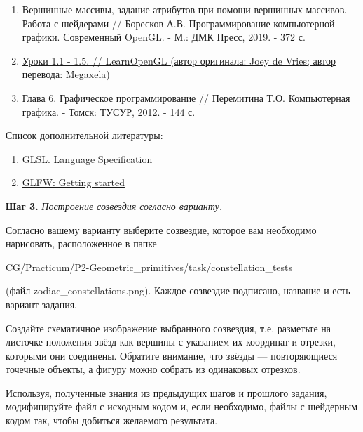 \documentclass[a4paper,12pt]{article}
\begin{document}
    \begin{enumerate}
        \item 
        Вершинные массивы, задание атрибутов при помощи вершинных массивов. Работа с шейдерами // Боресков А.В. Программирование компьютерной графики. Современный OpenGL. - М.: ДМК Пресс, 2019. - 372 с.
        \item 
        \href{https://habr.com/ru/post/310790/}{Уроки 1.1 - 1.5. // LearnOpenGL (автор оригинала: Joey de Vries; автор перевода: Megaxela)} 
        
        \item
        Глава 6. Графическое программирование // Перемитина Т.О. Компьютерная графика. - Томск: ТУСУР, 2012. - 144 с.
        
        \end{enumerate}

    Список дополнительной литературы:
    
    \begin{enumerate}

    \item 
    \href{https://www.khronos.org/registry/OpenGL/specs/gl/}{GLSL. Language Specification}
    
    \item
    \href{https://www.glfw.org/docs/latest/quick.html}{GLFW: Getting started}

    \end{enumerate}

    \textbf{Шаг 3.} \textit{Построение созвездия согласно варианту.}
    
    Согласно вашему варианту выберите созвездие, которое вам необходимо нарисовать, расположенное в папке 
    
    \textquotedbl CG/Practicum/P2-Geometric\_primitives/task/constellation\_tests\textquotedbl 
    
    (файл \textquotedbl zodiac\_constellations.png\textquotedbl). Каждое созвездие подписано, название и есть вариант задания.
    
    Создайте схематичное изображение выбранного созвездия, т.е. разметьте на листочке положения звёзд как вершины с указанием их координат и отрезки, которыми они соединены. Обратите внимание, что звёзды --- повторяющиеся точечные объекты, а фигуру можно собрать из одинаковых отрезков.
    
    Используя, полученные знания из предыдущих шагов и прошлого задания, модифицируйте файл с исходным кодом и, если необходимо, файлы с шейдерным кодом так, чтобы добиться желаемого результата.
    
\end{document}
